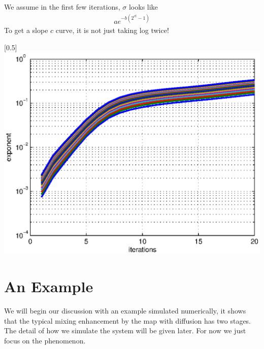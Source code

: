 We assume in the first few iterations, $\sigma$ looks like
\begin{eqnarray}
 a e^{-b(2^{ct}-1)}
\end{eqnarray}
To get a slope $c$ curve, it is not just taking log twice!


\centerline{\scalebox{0.5}[0.5]{\includegraphics{loglog.eps}}}


\section{An Example}
We will begin our discussion with an example simulated numerically,
it shows that the typical mixing enhancement by the map with
diffusion has two stages. The detail of how we simulate the system
will be given later. For now we just focus on the phenomenon.

